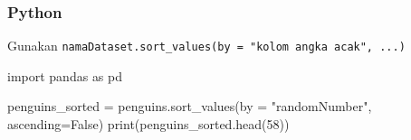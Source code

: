 \documentclass[
  letterpaper,
  DIV=11,
  numbers=noendperiod]{scrreprt}
\newenvironment{Shaded}{\begin{snugshade}}{\end{snugshade}}
\newcommand{\BuiltInTok}[1]{\textcolor[rgb]{0.00,0.23,0.31}{#1}}
\newcommand{\DecValTok}[1]{\textcolor[rgb]{0.68,0.00,0.00}{#1}}
\newcommand{\ImportTok}[1]{\textcolor[rgb]{0.00,0.46,0.62}{#1}}
\newcommand{\NormalTok}[1]{\textcolor[rgb]{0.00,0.23,0.31}{#1}}
\newcommand{\OperatorTok}[1]{\textcolor[rgb]{0.37,0.37,0.37}{#1}}
\newcommand{\StringTok}[1]{\textcolor[rgb]{0.13,0.47,0.30}{#1}}
\newcommand{\VariableTok}[1]{\textcolor[rgb]{0.07,0.07,0.07}{#1}}
\begin{document}
\hypertarget{python-3}{%
\subsubsection{Python}\label{python-3}}

Gunakan
\texttt{namaDataset.sort\_values(by\ =\ "kolom\ angka\ acak",\ ...)}

\begin{Shaded}
\begin{Highlighting}[]
\ImportTok{import}\NormalTok{ pandas }\ImportTok{as}\NormalTok{ pd}

\NormalTok{penguins\_sorted }\OperatorTok{=}\NormalTok{ penguins.sort\_values(by }\OperatorTok{=} \StringTok{"randomNumber"}\NormalTok{, ascending}\OperatorTok{=}\VariableTok{False}\NormalTok{)}
\BuiltInTok{print}\NormalTok{(penguins\_sorted.head(}\DecValTok{58}\NormalTok{))}
\end{Highlighting}
\end{Shaded}
\end{document}
